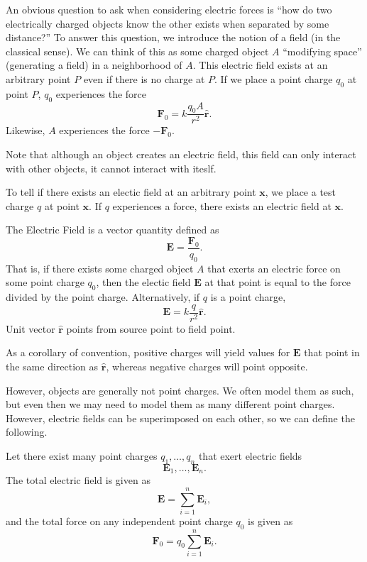 
An obvious question to ask when considering electric forces is ``how do two electrically charged objects know the other exists when separated by some distance?'' To answer this question, we introduce the notion of a field (in the classical sense). We can think of this as some charged object $A$ ``modifying space'' (generating a field) in a neighborhood of $A$. This electric field exists at an arbitrary point $P$ even if there is no charge at $P$. If we place a point charge $q_0$ at point $P$, $q_0$ experiences the force
\[
	\mathbf{F}_0=k \frac{q_0A}{r^2}\mathbf{\hat{r}}
.\]
Likewise, $A$ experiences the force $-\mathbf{F}_0$.

Note that although an object creates an electric field, this field can only interact with other objects, it cannot interact with iteslf.

To tell if there exists an electic field at an arbitrary point $\mathbf{x}$, we place a test charge $q$ at point $\mathbf{x}$. If $q$ experiences a force, there exists an electric field at $\mathbf{x}$.
\begin{definition}\label{dfn:1}
	The Electric Field is a vector quantity defined as
	\[
		\mathbf{E}=\frac{\mathbf{F}_0}{q_0}
	.\]
	That is, if there exists some charged object $A$ that exerts an electric force on some point charge $q_0$, then the electic field $\mathbf{E}$ at that point is equal to the force divided by the point charge. Alternatively, if $q$ is a point charge,
	\[
		\mathbf{E}=k \frac{q}{r^2}\mathbf{\hat{r}}
	.\]
	Unit vector $\mathbf{\hat{r}}$ points from source point to field point.
\end{definition}
As a corollary of convention, positive charges will yield values for $\mathbf{E}$ that point in the same direction as $\mathbf{\hat{r}}$, whereas negative charges will point opposite.

However, objects are generally not point charges. We often model them as such, but even then we may need to model them as many different point charges. However, electric fields can be superimposed on each other, so we can define the following.
\begin{theorem}\label{thm:2}
	Let there exist many point charges $q_1, \dots, q_n $ that exert electric fields
	\[
		\mathbf{E}_1, \dots, \mathbf{E}_n 
	.\]
	The total electric field is given as
	\[
		\mathbf{E}=\sum_{i=1}^{n} \mathbf{E}_i
	,\]
	and the total force on any independent point charge $q _0$ is given as
	\[
		\mathbf{F}_0=q_0 \sum_{i=1}^{n} \mathbf{E}_i
	.\]
\end{theorem}
